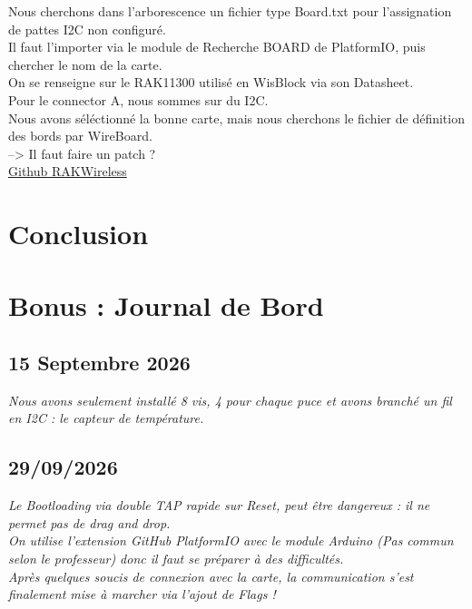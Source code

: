 \documentclass[10pt,a4paper,oneside]{article}
\begin{document}
Nous cherchons dans l'arborescence un fichier type Board.txt pour l'assignation de pattes I2C non configuré.\\
Il faut l'importer via le module de Recherche BOARD de PlatformIO, puis chercher le nom de la carte.\\

On se renseigne sur le RAK11300 utilisé en WisBlock via son Datasheet.\\
Pour le connector A, nous sommes sur du I2C.\\

Nous avons séléctionné la bonne carte, mais nous cherchons le fichier de définition des bords par WireBoard.\\ --> Il faut faire un patch ?\\

\href{https://github.com/RAKWireless/WisBlock/tree/master/PlatformIO} {Github RAKWireless}

\section{Conclusion}

\section{Bonus : Journal de Bord}

\subsection{15 Septembre 2026}

\textit{Nous avons seulement installé 8 vis, 4 pour chaque puce et avons branché un fil en I2C : le capteur de température.}\\

\subsection{29/09/2026}

\textit
{
  Le Bootloading via double TAP rapide sur Reset, peut être dangereux : il ne permet pas de drag and drop.\\
  On utilise l'extension GitHub PlatformIO avec le module Arduino (Pas commun selon le professeur) donc il faut se préparer à des difficultés.\\
  Après quelques soucis de connexion avec la carte, la communication s'est finalement mise à marcher via l'ajout de Flags !\\
}
\end{document}
